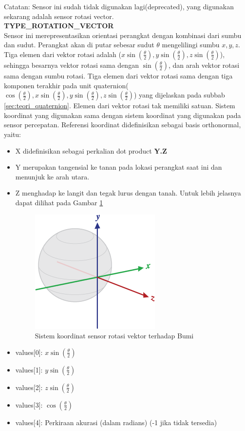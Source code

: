 Catatan: Sensor ini sudah tidak digunakan lagi(deprecated), yang digunakan sekarang adalah sensor rotasi vector.\\
\textbf{TYPE\_ROTATION\_VECTOR}\\
Sensor ini merepresentasikan orientasi perangkat dengan kombinasi dari sumbu dan sudut. Perangkat akan di putar sebesar sudut \(\theta\) mengelilingi sumbu \(x,y,z\). Tiga elemen dari vektor rotasi adalah (\(x \sin (\frac{\theta}{2}), y \sin (\frac{\theta}{2}), z \sin (\frac{\theta}{2})\)), sehingga besarnya vektor rotasi sama dengan \(\sin (\frac{\theta}{2})\), dan arah vektor rotasi sama dengan sumbu rotasi. Tiga elemen dari vektor rotasi sama dengan tiga komponen terakhir pada unit quaternion(\(\cos (\frac{\theta}{2}),x \sin (\frac{\theta}{2}), y \sin (\frac{\theta}{2}), z \sin (\frac{\theta}{2})\)) yang dijelaskan pada subbab \ref{sec:teori_quaternion}. Elemen dari vektor rotasi tak memiliki satuan. Sistem koordinat yang digunakan sama dengan sistem koordinat yang digunakan pada sensor percepatan. Referensi koordinat didefinisikan sebagai basis orthonormal, yaitu:
\begin{itemize}
	\item X didefinisikan sebagai perkalian dot product \textbf{Y.Z}
	\item Y merupakan tangensial ke tanan pada lokasi perangkat saat ini dan menunjuk ke arah utara. 
	\item Z menghadap ke langit dan tegak lurus dengan tanah. Untuk lebih jelasnya dapat dilihat pada Gambar \ref{fig:axis-globe}
	\begin{figure}[htbp]
	\centering
	\includegraphics[scale=1]{Gambar/axis-globe.png}
	\caption{Sistem koordinat sensor rotasi vektor terhadap Bumi} 
	\label{fig:axis-globe}
	\end{figure}
	\item values[0]: \(x \sin (\frac{\theta}{2})\)
	\item values[1]: \(y \sin (\frac{\theta}{2})\)
	\item values[2]: \(z \sin (\frac{\theta}{2})\)
	\item values[3]: \(\cos (\frac{\theta}{2})\)
	\item values[4]: Perkiraan akurasi (dalam radians) (-1 jika tidak tersedia) 
\end{itemize}
